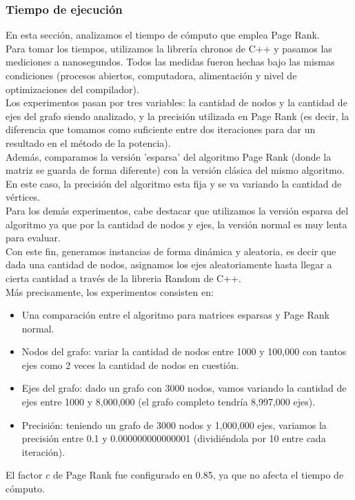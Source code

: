 \subsubsection{Tiempo de ejecución}

En esta sección, analizamos el tiempo de cómputo que emplea Page Rank.\\
Para tomar los tiempos, utilizamos la librería chronos de C++ y pasamos las mediciones a nanosegundos. Todos las medidas fueron hechas bajo las mismas condiciones (procesos abiertos, computadora, alimentación y nivel de optimizaciones del compilador).\\
Los experimentos pasan por tres variables: la cantidad de nodos y la cantidad de ejes del grafo siendo analizado, y la precisión utilizada en Page Rank (es decir, la diferencia que tomamos como suficiente entre dos iteraciones para dar un resultado en el método de la potencia).\\
Además, comparamos la versión 'esparsa' del algoritmo Page Rank (donde la matriz se guarda de forma diferente) con la versión clásica del mismo algoritmo. En este caso, la precisión del algoritmo esta fija y se va variando la cantidad de vértices.\\
Para los demás experimentos, cabe destacar que utilizamos la versión esparsa del algoritmo ya que por la cantidad de nodos y ejes, la versión normal es muy lenta para evaluar.\\
Con este fin, generamos instancias de forma dinámica y aleatoria, es decir que dada una cantidad de nodos, asignamos los ejes aleatoriamente hasta llegar a cierta cantidad a través de la libreria Random de C++.\\
Más precisamente, los experimentos consisten en:
\begin{itemize}
    \item Una comparación entre el algoritmo para matrices esparsas y Page Rank normal.
    \item Nodos del grafo: variar la cantidad de nodos entre 1000 y 100,000 con tantos ejes como 2 veces la cantidad de nodos en cuestión.
    \item Ejes del grafo: dado un grafo con 3000 nodos, vamos variando la cantidad de ejes entre 1000 y 8,000,000 (el grafo completo tendría 8,997,000 ejes).
    \item Precisión: teniendo un grafo de 3000 nodos y 1,000,000 ejes, variamos la precisión entre 0.1 y 0.000000000000001 (dividiéndola por 10 entre cada iteración).
\end{itemize}
El factor $c$ de Page Rank fue configurado en 0.85, ya que no afecta el tiempo de cómputo.\\


